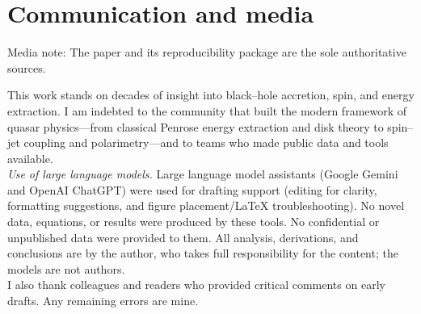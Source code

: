 \documentclass[twocolumn]{aastex701}
\begin{document}
\section*{Communication and media}
Media note: The paper and its reproducibility package are the sole authoritative sources.

\begin{acknowledgments}
This work stands on decades of insight into black–hole accretion, spin, and energy extraction. I am indebted to the community that built the modern framework of quasar physics—from classical Penrose energy extraction and disk theory to spin–jet coupling and polarimetry—and to teams who made public data and tools available.
\\[2pt]
\textit{Use of large language models.} Large language model assistants (Google Gemini and OpenAI ChatGPT) were used for drafting support (editing for clarity, formatting suggestions, and figure placement/LaTeX troubleshooting). No novel data, equations, or results were produced by these tools. No confidential or unpublished data were provided to them. All analysis, derivations, and conclusions are by the author, who takes full responsibility for the content; the models are not authors.
\\[2pt]
I also thank colleagues and readers who provided critical comments on early drafts. Any remaining errors are mine.
\end{acknowledgments}


\nocite{*}


\end{document}
